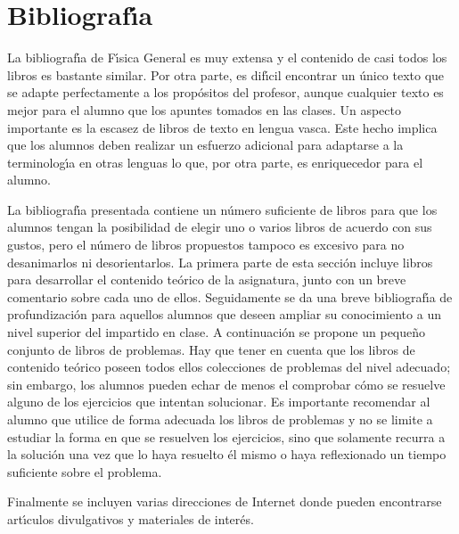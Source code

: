 \newpage
\section {Bibliograf\'{\i}a}
\label{PD-biblio}

La bibliograf\'{\i}a de F\'{\i}sica General es muy extensa y el contenido de 
casi todos los libros es bastante similar. Por otra parte, es dif\'{\i}cil
 encontrar un \'{u}nico texto que se adapte perfectamente a los prop\'{o}sitos
 del profesor, aunque cualquier texto es mejor para el alumno que 
los apuntes tomados en las clases. Un aspecto importante  es
 la escasez de libros de texto en lengua vasca. Este hecho implica que 
los alumnos deben realizar un esfuerzo adicional para adaptarse a
 la terminolog\'{\i}a en otras lenguas lo que, por otra parte,
es enriquecedor para el alumno.

La bibliograf\'{\i}a presentada contiene un n\'{u}mero suficiente de 
libros para que los alumnos tengan la posibilidad de elegir uno o varios 
libros de acuerdo con sus gustos, pero el n\'{u}mero de libros propuestos
 tampoco es excesivo para no desanimarlos ni desorientarlos.
 La primera parte de esta secci\'{o}n  incluye libros 
 para desarrollar el contenido te\'{o}rico de la 
asignatura, junto con un breve comentario sobre cada uno de ellos. 
Seguidamente se da una breve bibliograf\'{\i}a de profundizaci\'{o}n
para aquellos alumnos que deseen ampliar su conocimiento a un nivel superior
del impartido en clase.
A continuaci\'{o}n se propone un peque\~{n}o conjunto de libros de problemas. 
Hay que tener en cuenta que 
los libros de contenido te\'{o}rico  poseen todos ellos colecciones 
 de problemas del nivel adecuado; sin embargo, los
 alumnos pueden echar de menos el comprobar c\'{o}mo se resuelve alguno de
 los ejercicios que intentan solucionar. 
Es importante recomendar al alumno que utilice de forma adecuada los libros
 de problemas y no se limite a estudiar la forma en que se resuelven
 los ejercicios, sino que solamente recurra a la soluci\'{o}n una vez que lo haya
 resuelto \'{e}l mismo o haya reflexionado un tiempo suficiente sobre
 el problema.

Finalmente se incluyen varias direcciones de Internet donde pueden encontrarse 
 art\'{\i}culos divulgativos y materiales de inter\'{e}s.


